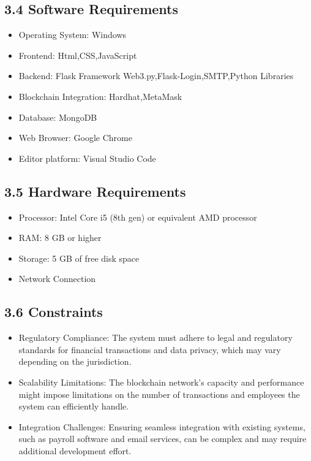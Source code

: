 \documentclass[12pt]{report}
\begin{document}
\subsection*{3.4 Software Requirements}
\begin{center}    
    \justify 
\begin{itemize}
    \item Operating System: Windows
    \item Frontend: Html,CSS,JavaScript
    \item Backend: Flask Framework Web3.py,Flask-Login,SMTP,Python Libraries
    \item Blockchain Integration: Hardhat,MetaMask
    \item Database: MongoDB
    \item Web Browser: Google Chrome
    \item Editor platform: Visual Studio Code 
\end{itemize}
\end{center}
\vspace{0.7em}
\subsection*{3.5 Hardware Requirements}
\begin{center}    
    \justify 
\begin{itemize}
    \item Processor: Intel Core i5 (8th gen) or equivalent AMD processor
    \item RAM: 8 GB or higher
    \item Storage: 5 GB of free disk space
    \item Network Connection
\end{itemize}
\end{center}
\vspace{0.7em}
\subsection*{3.6 Constraints}
\begin{center}    
    \justify 
\begin{itemize}
    \item Regulatory Compliance: The system must adhere to legal and regulatory standards for financial transactions and data privacy, which may vary depending on the jurisdiction.
    \item Scalability Limitations: The blockchain network's capacity and performance might impose limitations on the number of transactions and employees the system can efficiently handle.
    \item Integration Challenges: Ensuring seamless integration with existing systems, such as payroll software and email services, can be complex and may require additional development effort.
\end{itemize}
\end{center}
\end{document}
